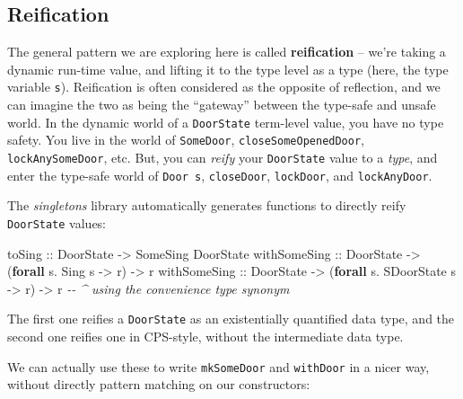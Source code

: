 \documentclass[]{article}
\newenvironment{Shaded}{}{}
\newcommand{\CommentTok}[1]{\textcolor[rgb]{0.38,0.63,0.69}{\textit{#1}}}
\newcommand{\DataTypeTok}[1]{\textcolor[rgb]{0.56,0.13,0.00}{#1}}
\newcommand{\KeywordTok}[1]{\textcolor[rgb]{0.00,0.44,0.13}{\textbf{#1}}}
\newcommand{\NormalTok}[1]{#1}
\newcommand{\OperatorTok}[1]{\textcolor[rgb]{0.40,0.40,0.40}{#1}}
\newcommand{\OtherTok}[1]{\textcolor[rgb]{0.00,0.44,0.13}{#1}}
\begin{document}
\subsection{Reification}\label{reification}

The general pattern we are exploring here is called \textbf{reification} --
we're taking a dynamic run-time value, and lifting it to the type level as a
type (here, the type variable \texttt{s}). Reification is often considered as
the opposite of reflection, and we can imagine the two as being the ``gateway''
between the type-safe and unsafe world. In the dynamic world of a
\texttt{DoorState} term-level value, you have no type safety. You live in the
world of \texttt{SomeDoor}, \texttt{closeSomeOpenedDoor},
\texttt{lockAnySomeDoor}, etc. But, you can \emph{reify} your \texttt{DoorState}
value to a \emph{type}, and enter the type-safe world of \texttt{Door\ s},
\texttt{closeDoor}, \texttt{lockDoor}, and \texttt{lockAnyDoor}.

The \emph{singletons} library automatically generates functions to directly
reify \texttt{DoorState} values:

\begin{Shaded}
\begin{Highlighting}[]
\OtherTok{toSing       ::} \DataTypeTok{DoorState} \OtherTok{{-}\textgreater{}} \DataTypeTok{SomeSing} \DataTypeTok{DoorState}
\OtherTok{withSomeSing ::} \DataTypeTok{DoorState} \OtherTok{{-}\textgreater{}}\NormalTok{ (}\KeywordTok{forall}\NormalTok{ s}\OperatorTok{.} \DataTypeTok{Sing}\NormalTok{ s        }\OtherTok{{-}\textgreater{}}\NormalTok{ r) }\OtherTok{{-}\textgreater{}}\NormalTok{ r}
\OtherTok{withSomeSing ::} \DataTypeTok{DoorState} \OtherTok{{-}\textgreater{}}\NormalTok{ (}\KeywordTok{forall}\NormalTok{ s}\OperatorTok{.} \DataTypeTok{SDoorState}\NormalTok{ s  }\OtherTok{{-}\textgreater{}}\NormalTok{ r) }\OtherTok{{-}\textgreater{}}\NormalTok{ r}
                                     \CommentTok{{-}{-} \^{} using the convenience type synonym}
\end{Highlighting}
\end{Shaded}

The first one reifies a \texttt{DoorState} as an existentially quantified data
type, and the second one reifies one in CPS-style, without the intermediate data
type.

We can actually use these to write \texttt{mkSomeDoor} and \texttt{withDoor} in
a nicer way, without directly pattern matching on our constructors:
\end{document}
